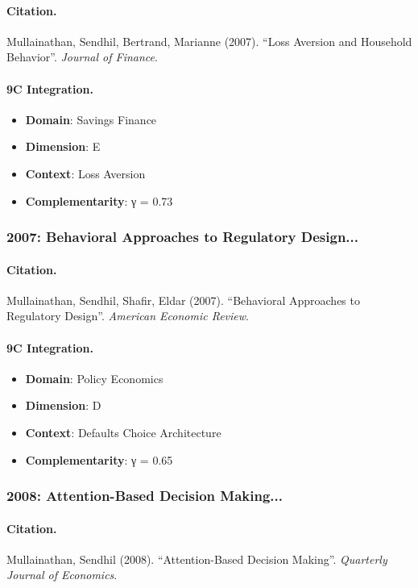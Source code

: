 \paragraph{Citation.}
Mullainathan, Sendhil, Bertrand, Marianne (2007). ``Loss Aversion and Household Behavior''. \textit{Journal of Finance}.

\paragraph{9C Integration.}
\begin{itemize}[nosep]
  \item \textbf{Domain}: Savings Finance
  \item \textbf{Dimension}: E
  \item \textbf{Context}: Loss Aversion
  \item \textbf{Complementarity}: γ = 0.73
\end{itemize}


\subsubsection{2007: Behavioral Approaches to Regulatory Design...}

\paragraph{Citation.}
Mullainathan, Sendhil, Shafir, Eldar (2007). ``Behavioral Approaches to Regulatory Design''. \textit{American Economic Review}.

\paragraph{9C Integration.}
\begin{itemize}[nosep]
  \item \textbf{Domain}: Policy Economics
  \item \textbf{Dimension}: D
  \item \textbf{Context}: Defaults Choice Architecture
  \item \textbf{Complementarity}: γ = 0.65
\end{itemize}


\subsubsection{2008: Attention-Based Decision Making...}

\paragraph{Citation.}
Mullainathan, Sendhil (2008). ``Attention-Based Decision Making''. \textit{Quarterly Journal of Economics}.

